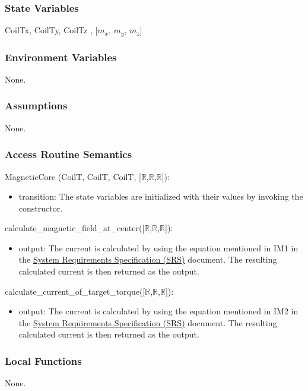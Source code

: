 \documentclass[12pt, titlepage]{article}
\begin{document}
\subsubsection{State Variables}
CoilTx,  CoilTy,  CoilTz , [$m_x$, $m_y$, $m_z$]
\subsubsection{Environment Variables}
None.
\subsubsection{Assumptions}
None.

\subsubsection{Access Routine Semantics}

\noindent MagneticCore (CoilT, CoilT, CoilT, [$\mathbb{R}$,$\mathbb{R}$,$\mathbb{R}$]):
\begin{itemize}
\item transition: The state variables are initialized with their values by invoking the constructor.
\end{itemize}

\noindent calculate\_magnetic\_field\_at\_center([$\mathbb{R}$,$\mathbb{R}$,$\mathbb{R}$]):
\begin{itemize}
\item output: The current is calculated by using the equation mentioned in IM1 in the \href{https://github.com/rnorouziani/3D-H3C/blob/main/docs/SRS/SRS.pdf}{System Requirements Specification (SRS)} document. The resulting calculated current is then returned as the output.
\end{itemize}

\noindent calculate\_current\_of\_target\_torque([$\mathbb{R}$,$\mathbb{R}$,$\mathbb{R}$]):
\begin{itemize}
\item output: The current is calculated by using the equation mentioned in IM2 in the \href{https://github.com/rnorouziani/3D-H3C/blob/main/docs/SRS/SRS.pdf}{System Requirements Specification (SRS)} document. The resulting calculated current is then returned as the output.
\end{itemize}

\subsubsection{Local Functions}
None.
\end{document}
